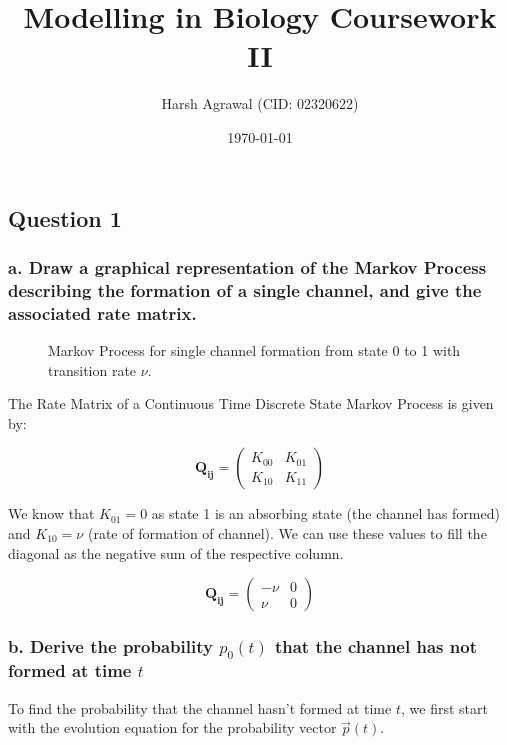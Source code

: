 \documentclass{article}
\title{Modelling in Biology Coursework II}
\author{Harsh Agrawal (CID\@: 02320622)}
\date{\today}
\begin{document}
\maketitle

\subsection*{Question 1}

\subsubsection*{a. Draw a graphical representation of the Markov Process describing the formation of a single channel, and give the associated rate matrix.}

\begin{figure}[htbp]
    \centering
    \caption{\centering Markov Process for single channel formation from state 0 to 1 with transition rate $\nu$.}\label{fig:q1_process}
\end{figure}

The Rate Matrix of a Continuous Time Discrete State Markov Process is given by:

\[
    \mathbf{Q_{ij}} = \begin{pmatrix}
        K_{00} & K_{01} \\
        K_{10} & K_{11}
    \end{pmatrix}
\]

We know that $K_{01} = 0$ as state 1 is an absorbing state (the channel has
formed) and $K_{10} = \nu$ (rate of formation of channel). We can use these
values to fill the diagonal as the negative sum of the respective column.

\begin{equation}
    \boxed{\mathbf{Q_{ij}} = \begin{pmatrix}
            -\nu & 0 \\
            \nu  & 0
        \end{pmatrix}}
\end{equation}
\subsubsection*{b. Derive the probability $p_0(t)$ that the channel has not formed at time $t$}
To find the probability that the channel hasn't formed at time $t$, we first start with the evolution equation for the probability vector $\vec{p}(t)$.
\end{document}
